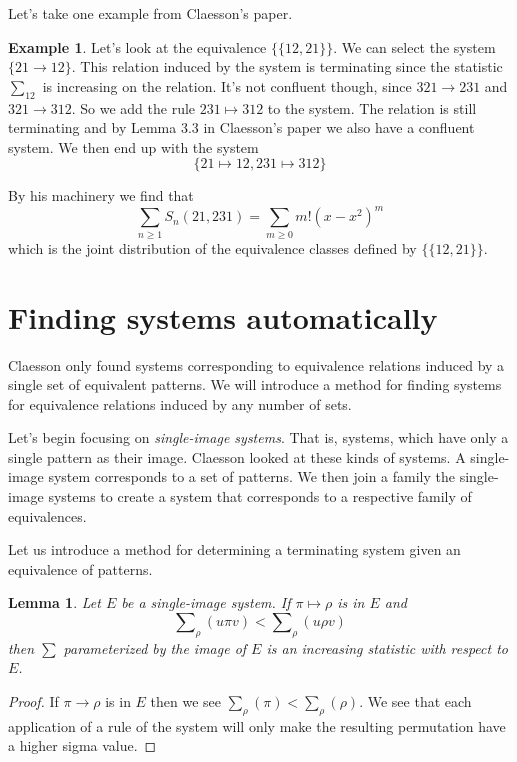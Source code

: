 \documentclass[openany, a4paper, 11pt, english]{article}
\newcommand{\breath}{\vspace{6pt plus 2pt minus 1pt}\noindent}
\newcommand{\patternrule}{ \mapsto \!}
\newtheorem{lemma}[theorem]{Lemma}
\theoremstyle{definition}
\newtheorem{example}[theorem]{Example}
\newcommand{\Sym}{S}
\begin{document}
Let's take one example from Claesson's paper.
\begin{example}
    Let's look at the equivalence $\{ \{ 12, 21 \} \}$. We can select the system $\{
        21 \to 12 \}$. This relation induced by the system is terminating since the statistic
    $\sum_{12}$ is increasing on the relation. It's not
    confluent though, since $321 \to 231$ and $321 \to 312$. So we add the rule
    $231 \patternrule 312$ to the system. The relation is still terminating and by Lemma
    3.3 in Claesson's paper we also have a confluent system. We then end up with
    the system 
    \[
        \{ 21 \patternrule 12, 231 \patternrule 312 \}
    \]

    \breath

    By his machinery we find that 
    \[
        \sum_{n \geq 1} \Sym_n(21, 231) = \sum_{m \geq 0} m!(x-x^2)^m
    \]
    which is the joint distribution of the equivalence classes defined by 
    $\{ \{ 12, 21 \} \}$.
\end{example}

\section{Finding systems automatically}
Claesson only found systems corresponding to equivalence relations induced by a
single set of equivalent patterns. We will introduce a method for finding
systems for equivalence relations induced by any number of sets.

Let's begin focusing on \emph{single-image systems}. That is, systems, which
have only a single pattern as their image. Claesson looked at these kinds
of systems. A single-image system corresponds to a set of patterns.
We then join a family the single-image systems to
create a system that corresponds to a respective family of equivalences.

Let us introduce a method for determining a terminating system given an
equivalence of patterns.

\begin{lemma}
    Let $E$ be a single-image system. If $\pi \patternrule \rho$ is in $E$ and 
    \[
        \sum\nolimits_\rho(u\pi v) < \sum\nolimits_\rho(u \rho v) \tag{$\ast$}
        \label{increasingimage}
    \]
    then $\sum$ parameterized by the image of $E$ is an increasing statistic
    with respect to $E$.
\end{lemma}
\begin{proof}
    If $\pi \to \rho$ is in $E$ then we see $\sum_\rho(\pi) <
    \sum_\rho(\rho)$.  We see that each application of a rule of the system
    will only make the resulting permutation have a higher sigma value.
\end{proof}
\end{document}
